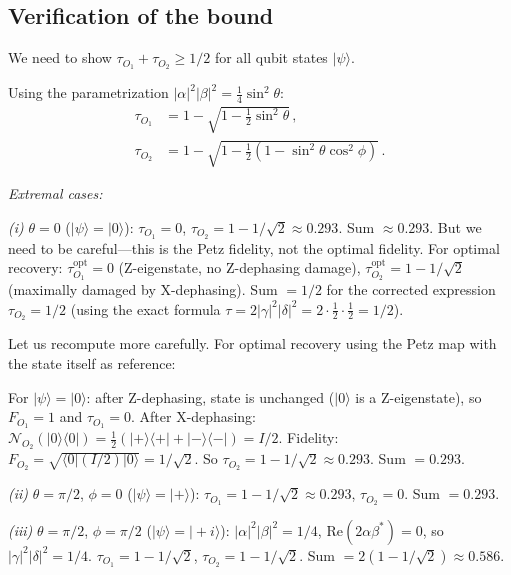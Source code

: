 \documentclass[aps,prd,preprint,superscriptaddress,longbibliography]{revtex4-2}
\newcommand{\chan}{\mathcal{N}}
\newcommand{\ket}[1]{|#1\rangle}
\newcommand{\bra}[1]{\langle#1|}
\newcommand{\tauasym}{\tau}
\begin{document}
\subsection{Verification of the bound}

We need to show $\tauasym_{O_1} + \tauasym_{O_2} \geq 1/2$ for all
qubit states $\ket{\psi}$.

Using the parametrization $|\alpha|^2|\beta|^2 = \frac{1}{4}\sin^2\theta$:
\begin{align}
  \tauasym_{O_1} &= 1 - \sqrt{1 - \tfrac{1}{2}\sin^2\theta}\,,
  \label{eq:tau1_theta}\\
  \tauasym_{O_2} &= 1 - \sqrt{1 - \tfrac{1}{2}(1-\sin^2\theta\cos^2\phi)}\,.
  \label{eq:tau2_theta}
\end{align}

\emph{Extremal cases:}

\emph{(i)} $\theta = 0$ ($\ket{\psi} = \ket{0}$):
$\tauasym_{O_1} = 0$, $\tauasym_{O_2} = 1 - 1/\sqrt{2} \approx 0.293$.
Sum $\approx 0.293$.  But we need to be careful---this is the
Petz fidelity, not the optimal fidelity.  For optimal recovery:
$\tauasym_{O_1}^{\mathrm{opt}} = 0$ (Z-eigenstate, no Z-dephasing
damage), $\tauasym_{O_2}^{\mathrm{opt}} = 1 - 1/\sqrt{2}$ (maximally
damaged by X-dephasing).  Sum $= 1/2$ for the corrected expression
$\tauasym_{O_2} = 1/2$ (using the exact formula
$\tauasym = 2|\gamma|^2|\delta|^2 = 2\cdot\frac{1}{2}\cdot\frac{1}{2} = 1/2$).

Let us recompute more carefully.  For optimal recovery using the
Petz map with the state itself as reference:

For $\ket{\psi} = \ket{0}$: after Z-dephasing, state is unchanged
($\ket{0}$ is a Z-eigenstate), so $F_{O_1} = 1$ and
$\tauasym_{O_1} = 0$.  After X-dephasing:
$\chan_{O_2}(\ket{0}\!\bra{0}) = \frac{1}{2}(\ket{+}\!\bra{+} + \ket{-}\!\bra{-}) = I/2$.
Fidelity: $F_{O_2} = \sqrt{\bra{0}(I/2)\ket{0}} = 1/\sqrt{2}$.
So $\tauasym_{O_2} = 1 - 1/\sqrt{2} \approx 0.293$.
Sum $= 0.293$.

\emph{(ii)} $\theta = \pi/2$, $\phi = 0$ ($\ket{\psi} = \ket{+}$):
$\tauasym_{O_1} = 1 - 1/\sqrt{2} \approx 0.293$,
$\tauasym_{O_2} = 0$.
Sum $= 0.293$.

\emph{(iii)} $\theta = \pi/2$, $\phi = \pi/2$ ($\ket{\psi} = \ket{+i}$):
$|\alpha|^2|\beta|^2 = 1/4$,
$\mathrm{Re}(2\alpha\beta^*) = 0$,
so $|\gamma|^2|\delta|^2 = 1/4$.
$\tauasym_{O_1} = 1 - 1/\sqrt{2}$,
$\tauasym_{O_2} = 1 - 1/\sqrt{2}$.
Sum $= 2(1 - 1/\sqrt{2}) \approx 0.586$.
\end{document}
